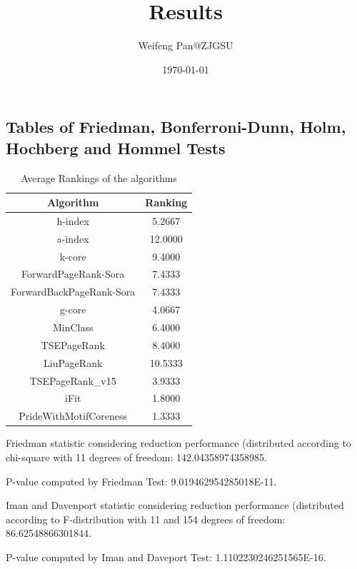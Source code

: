 \documentclass[a4paper,10pt]{article}
\title{Results}
\author{Weifeng Pan@ZJGSU}
\date{\today}
\begin{document}
\begin{landscape}
\oddsidemargin 0in \topmargin 0in\maketitle
\section{Tables of Friedman, Bonferroni-Dunn, Holm, Hochberg and Hommel Tests}
\begin{table}[!htp]
\centering
\caption{Average Rankings of the algorithms
}\begin{tabular}{c|c}
Algorithm&Ranking\\
\hline
h-index&5.2667\\
a-index&12.0000\\
k-core&9.4000\\
ForwardPageRank-Sora&7.4333\\
ForwardBackPageRank-Sora&7.4333\\
g-core&4.0667\\
MinClass&6.4000\\
TSEPageRank&8.4000\\
LiuPageRank&10.5333\\
TSEPageRank_v15&3.9333\\
iFit&1.8000\\
PrideWithMotifCoreness&1.3333\\
\end{tabular}
\end{table}


Friedman statistic considering reduction performance (distributed according to chi-square with 11 degrees of freedom: 142.04358974358985.


P-value computed by Friedman Test: 9.019462954285018E-11.\newline

Iman and Davenport statistic considering reduction performance (distributed according to F-distribution with 11 and 154 degrees of freedom: 86.62548866301844.


P-value computed by Iman and Daveport Test: 1.1102230246251565E-16.\newline


\end{landscape}
\end{document}
